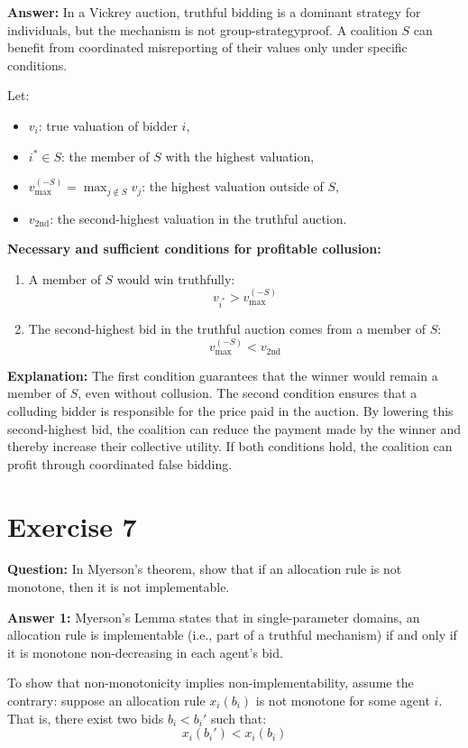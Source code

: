 \documentclass[12pt]{article}
\begin{document}
\textbf{Answer:} In a Vickrey auction, truthful bidding is a dominant strategy for individuals, but the mechanism is not group-strategyproof. A coalition $S$ can benefit from coordinated misreporting of their values only under specific conditions.

Let:
\begin{itemize}
  \item $v_i$: true valuation of bidder $i$,
  \item $i^* \in S$: the member of $S$ with the highest valuation,
  \item $v_{\text{max}}^{(-S)} = \max_{j \notin S} v_j$: the highest valuation outside of $S$,
  \item $v_{\text{2nd}}$: the second-highest valuation in the truthful auction.
\end{itemize}

\textbf{Necessary and sufficient conditions for profitable collusion:}
\begin{enumerate}
  \item A member of $S$ would win truthfully:
  \[
  v_{i^*} > v_{\text{max}}^{(-S)}
  \]
  \item The second-highest bid in the truthful auction comes from a member of $S$:
  \[
  v_{\text{max}}^{(-S)} < v_{\text{2nd}}
  \]
\end{enumerate}

\textbf{Explanation:} The first condition guarantees that the winner would remain a member of $S$, even without collusion. The second condition ensures that a colluding bidder is responsible for the price paid in the auction. By lowering this second-highest bid, the coalition can reduce the payment made by the winner and thereby increase their collective utility. If both conditions hold, the coalition can profit through coordinated false bidding.

\section*{Exercise 7}

\textbf{Question:} In Myerson's theorem, show that if an allocation rule is not monotone, then it is not implementable.

\textbf{Answer 1:} Myerson’s Lemma states that in single-parameter domains, an allocation rule is implementable (i.e., part of a truthful mechanism) if and only if it is monotone non-decreasing in each agent’s bid.

To show that non-monotonicity implies non-implementability, assume the contrary: suppose an allocation rule $x_i(b_i)$ is not monotone for some agent $i$. That is, there exist two bids $b_i < b_i'$ such that:
\[
x_i(b_i') < x_i(b_i)
\]
\end{document}
